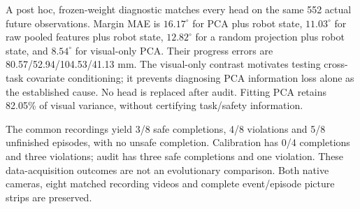 A post hoc, frozen-weight diagnostic matches every head on the same 552 actual
future observations. Margin MAE is $16.17^\circ$ for PCA plus robot state,
$11.03^\circ$ for raw pooled features plus robot state, $12.82^\circ$ for a random
projection plus robot state, and $8.54^\circ$ for visual-only PCA. Their progress
errors are 80.57/52.94/104.53/41.13 mm. The visual-only contrast motivates testing
cross-task covariate conditioning; it prevents diagnosing PCA information loss
alone as the established cause. No head is replaced after audit. Fitting PCA
retains 82.05\% of visual variance, without certifying task/safety information.

The common recordings yield 3/8 safe completions, 4/8 violations and 5/8 unfinished
episodes, with no unsafe completion. Calibration has 0/4 completions and three
violations; audit has three safe completions and one violation. These data-acquisition
outcomes are not an evolutionary comparison. Both native cameras, eight matched
recording videos and complete event/episode picture strips are preserved.
